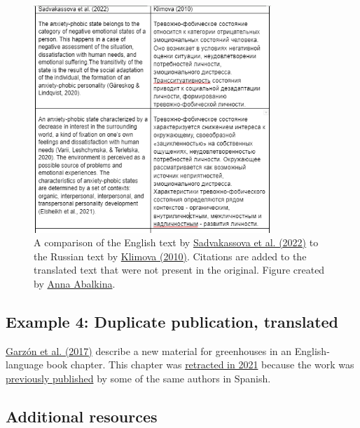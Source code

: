 \documentclass[letterpaper, 12pt]{article}
\begin{document}
\begin{figure}[h!tbp]
    \centering
    \includegraphics[width=0.8\textwidth]{img/plagiarism/image-1697289264849.png}
    \caption*{A comparison of the English text by \href{https://doi.org/10.1111/mbe.12345}{Sadvakassova et al. (2022)} to the Russian text by \href{https://cyberleninka.ru/article/n/harakteristika-trevozhno-fobicheskogo-sostoyaniya-u-detey-doshkolnogo-vozrasta-s-zaderzhkoy-psihicheskogo-razvitiya-kak}{Klimova (2010)}. Citations are added to the translated text that were not present in the original. Figure created by \href{https://pubpeer.com/publications/A6C5007F7D6DF81B20F72098A04F20\#2}{Anna Abalkina}.}
\end{figure}

\subsection*{Example 4: Duplicate publication, translated}

\href{https://doi.org/10.1007/978-3-319-51859-6_14}{Garz\'on et al. (2017)} describe a new material for greenhouses in an English-language book chapter. This chapter was \href{https://doi.org/10.1007/978-3-319-51859-6_20}{retracted in 2021} because the work was \href{https://ingenieriacivil.cedex.es/index.php/ingenieria-civil/article/view/521}{previously published} by some of the same authors in Spanish.

\pagebreak

\subsection*{Additional resources}
\end{document}
